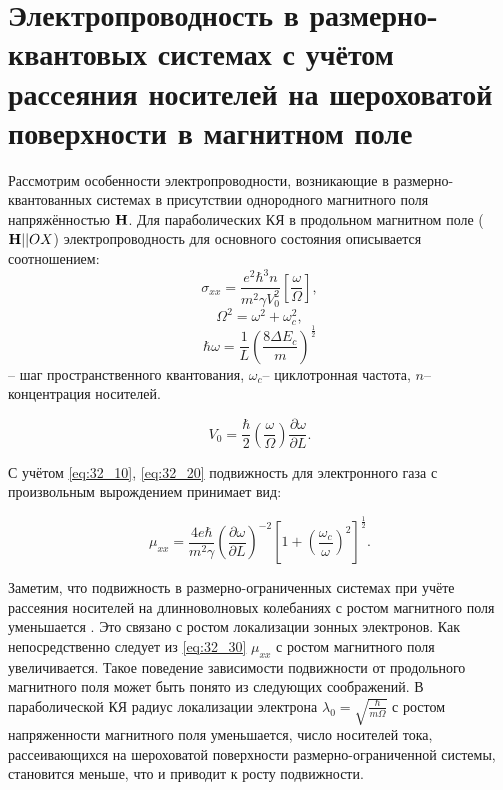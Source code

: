 \section{ Электропроводность в размерно-квантовых системах с учётом рассеяния носителей на шероховатой поверхности в магнитном поле}

Рассмотрим особенности электропроводности, возникающие в размерно-квантованных системах в присутствии однородного магнитного поля напряжённостью $\boldsymbol{\mathbf{H}}$. Для параболических КЯ в продольном магнитном поле ($\boldsymbol{\mathbf{H}} || OX$) электропроводность для основного состояния описывается соотношением:
\begin{equation} \label{eq:32_10}
\sigma _{xx} =\frac{e^{2} \hbar ^{3} n}{m^{2} \gamma V_{0}^{2} } \left[\frac{\omega }{\Omega } \right],
 \end{equation}
\[
\Omega ^{2} =\omega ^{2} +\omega _{c}^{2},
\] 
\[
\hbar \omega =\frac{1}{L} \left(\frac{8\Delta E_{c} }{m} \right)^{\frac{1}{2} } 
\]
-- шаг пространственного квантования, $\omega _{c} $-- циклотронная частота, $n$-- концентрация носителей.

\begin{equation} \label{eq:32_20}
V_{0} =\frac{\hbar }{2} \left(\frac{\omega }{\Omega } \right)\frac{\partial \omega }{\partial L} .
\end{equation}

С учётом \eqref{eq:32_10}, \eqref{eq:32_20} подвижность для электронного газа с произвольным вырождением принимает вид:

\begin{equation} \label{eq:32_30}
\mu _{xx} =\frac{4e\hbar }{m^{2} \gamma } \left(\frac{\partial \omega }{\partial L} \right)^{-2} \left[1+\left(\frac{\omega _{c} }{\omega } \right)^{2} \right]^{\frac{1}{2} }.
\end{equation}

Заметим, что подвижность в размерно-ограниченных системах при учёте рассеяния носителей на длинноволновых колебаниях с ростом магнитного поля уменьшается \cite{Sinyavskii1998}. Это связано с ростом локализации зонных электронов. Как непосредственно следует из \eqref{eq:32_30} $\mu _{xx} $ с ростом магнитного поля увеличивается. Такое поведение зависимости подвижности от продольного магнитного поля может быть понято из следующих соображений. В параболической КЯ радиус локализации электрона $\lambda _{0} =\sqrt{\frac{\hbar }{m\Omega } } $ с ростом напряженности магнитного поля уменьшается, число носителей тока, рассеивающихся на шероховатой поверхности размерно-ограниченной системы, становится меньше, что и приводит к росту подвижности.

